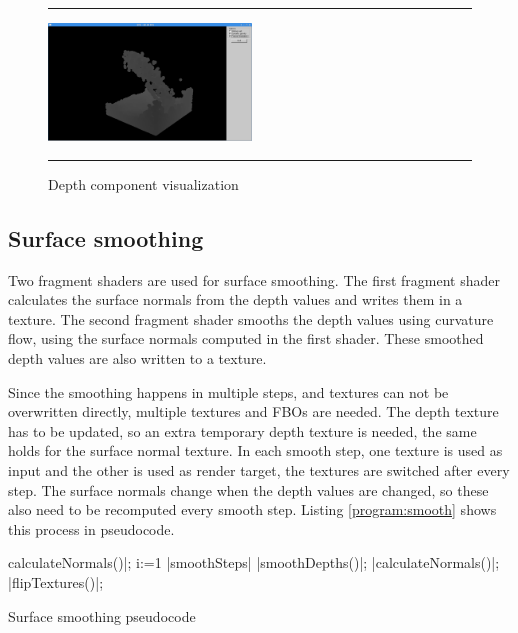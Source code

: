\begin{figure}[!th]
\hrule
\begin{center}
\vspace*{2ex}\includegraphics[width=0.48\textwidth]{pictures/depth.png}
\end{center}
\caption{Depth component visualization}
\label{fig:depth} 
\vspace*{2ex}
\hrule
\end{figure}

\subsection{Surface smoothing}
Two fragment shaders are used for surface smoothing.
The first fragment shader calculates the surface normals from the depth values and writes them in a texture.
The second fragment shader smooths the depth values using curvature flow, using the surface normals computed in the first shader.
These smoothed depth values are also written to a texture.

Since the smoothing happens in multiple steps, and textures can not be overwritten directly, multiple textures and FBOs are needed.
The depth texture has to be updated, so an extra temporary depth texture is needed, the same holds for the surface normal texture.
In each smooth step, one texture is used as input and the other is used as render target, the textures are switched after every step.
The surface normals change when the depth values are changed, so these also need to be recomputed every smooth step.
Listing \ref{program:smooth} shows this process in pseudocode.

\begin{algorithm}
	\begin{program}
	\caption
	|calculateNormals()|;
	\FOR i:=1 \TO |smoothSteps| \DO
		|smoothDepths()|;
		|calculateNormals()|;
		|flipTextures()|;
	\end{program}
	\label{program:smooth}
	\caption{Surface smoothing pseudocode}
\end{algorithm}

